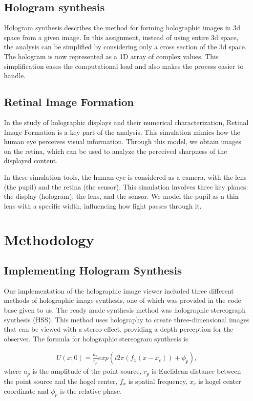 \documentclass[12pt,a4paper,english
]{tunithesis}
\begin{document}
\section{Hologram synthesis}
Hologram synthesis describes the method for forming holographic images in 3d space from a given image. In this assignment, instead of using entire 3d space, the analysis can be simplified by considering only a cross section of the 3d space. The hologram is now represented as a 1D array of complex values. This simplification eases the computational load and also makes the process easier to handle.

\section{Retinal Image Formation}
In the study of holographic displays and their numerical characterization, Retinal Image Formation is a key part of the analysis. This simulation mimics how the human eye perceives visual information. Through this model, we obtain images on the retina, which can be used to analyze the perceived sharpness of the displayed content.

In these simulation tools, the human eye is considered as a camera, with the lens (the pupil) and the retina (the sensor). This simulation involves three key planes: the display (hologram), the lens, and the sensor. We model the pupil as a thin lens with a specific width, influencing how light passes through it.



\chapter{Methodology}
\label{sec:methodology}

\section{Implementing Hologram Synthesis}
Our implementation of the holographic image viewer included three different methods of holographic image synthesis, one of which was provided in the code base given to us. The ready made synthesis method was holographic stereograph synthesis (HSS). This method uses holography to create three-dimensional images that can be viewed with a stereo effect, providing a depth perception for the observer. The formula for holographic stereogram synthesis is 

\begin{align}
  \label{eq:hss}
  U(x;0) = \frac{a_p}{r_p}exp(i 2\pi(f_x(x-x_c))+\phi_p),
\end{align}
where $a_p$ is the amplitude of the point source, $r_p$ is Euclidean distance between the point source and the hogel center, $f_x$ is spatial frequency, $x_c$ is hogel center coordinate and $\phi_p$ is the relative phase.
\end{document}
